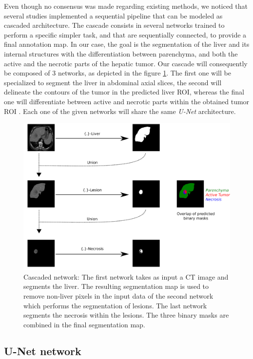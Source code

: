 Even though no consensus was made regarding existing methods, we noticed that
several studies implemented a sequential pipeline that can be modeled as
cascaded architecture. The cascade consists in several networks trained
to perform a specific simpler task, and that are sequentially connected, to
provide a final annotation map. In our case, the goal is the
segmentation of the liver and its internal structures with the
differentiation between parenchyma, and both the active and the necrotic
parts of the hepatic tumor.
Our cascade will consequently be composed of 3 networks, as depicted
in the figure \ref{CARS_Cascade}. The first one will be specialized to segment the liver in
abdominal axial slices, the second will delineate the contours of the
tumor in the predicted liver ROI, whereas the final one will
differentiate between active and necrotic parts within the obtained
tumor ROI \cite{Ouhmich2019}.
Each one of the given networks will share the same \emph{U-Net}
architecture.

\begin{figure}[th!]
	\centering
	\includegraphics[width=0.7\linewidth]{images/image26}
	\caption{Cascaded network: The first network takes as input a CT image and segments the liver. The resulting segmentation map is used to remove non-liver pixels in the input data of the second network which performs the segmentation of lesions. The last network segments the necrosis within the lesions. The three binary masks are combined in the final segmentation map.}
	\label{CARS_Cascade}
\end{figure}


\subsection{U-Net network}

